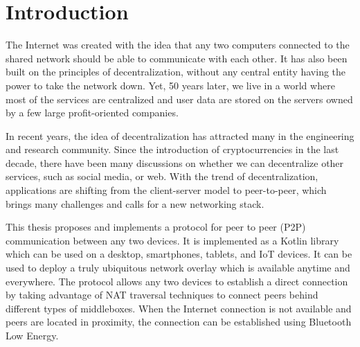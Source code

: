 \chapter{Introduction}


The Internet was created with the idea that any two computers connected to the shared network should be able to communicate with each other. It has also been built on the principles of decentralization, without any central entity having the power to take the network down. Yet, 50 years later, we live in a world where most of the services are centralized and user data are stored on the servers owned by a few large profit-oriented companies.

In recent years, the idea of decentralization has attracted many in the engineering and research community. Since the introduction of cryptocurrencies in the last decade, there have been many discussions on whether we can decentralize other services, such as social media, or web. With the trend of decentralization, applications are shifting from the client-server model to peer-to-peer, which brings many challenges and calls for a new networking stack.


This thesis proposes and implements a protocol for peer to peer (P2P) communication between any two devices. It is implemented as a Kotlin library which can be used on a desktop, smartphones, tablets, and IoT devices. It can be used to deploy a truly ubiquitous network overlay which is available anytime and everywhere. The protocol allows any two devices to establish a direct connection by taking advantage of NAT traversal techniques to connect peers behind different types of middleboxes. When the Internet connection is not available and peers are located in proximity, the connection can be established using Bluetooth Low Energy.

